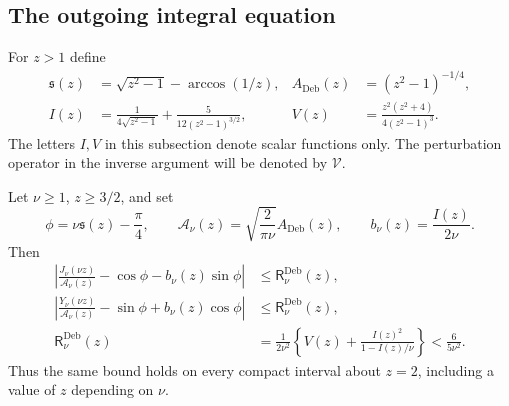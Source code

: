 \subsection{The outgoing integral equation}

For $z>1$ define
\begin{align}
 \mathfrak s(z)&=\sqrt{z^2-1}-\arccos(1/z),
 &A_{\mathrm{Deb}}(z)&=(z^2-1)^{-1/4},\label{inf:debye-definitions}\\
 I(z)&=\frac1{4\sqrt{z^2-1}}+
                \frac5{12(z^2-1)^{3/2}},
 &V(z)&=\frac{z^2(z^2+4)}{4(z^2-1)^3}.\nonumber
\end{align}
The letters $I,V$ in this subsection denote scalar functions only.
The perturbation operator in the inverse argument will be denoted by
$\mathcal V$.

\begin{lemma}\label{inf:debye-first}
Let $\nu\ge1$, $z\ge3/2$, and set
\[
 \phi=\nu\mathfrak s(z)-\frac\pi4,\qquad
 \mathcal A_\nu(z)=\sqrt{\frac2{\pi\nu}}A_{\mathrm{Deb}}(z),
 \qquad b_\nu(z)=\frac{I(z)}{2\nu}.
\]
Then
\begin{align}
 \left|\frac{J_\nu(\nu z)}{\mathcal A_\nu(z)}
           -\cos\phi-b_\nu(z)\sin\phi\right|&\le\mathsf R_\nu^{\mathrm{Deb}}(z),
 \label{inf:debye-J}\\
 \left|\frac{Y_\nu(\nu z)}{\mathcal A_\nu(z)}
           -\sin\phi+b_\nu(z)\cos\phi\right|&\le\mathsf R_\nu^{\mathrm{Deb}}(z),
 \label{inf:debye-Y}\\
 \mathsf R_\nu^{\mathrm{Deb}}(z)&=
 \frac1{2\nu^2}\left\{V(z)+\frac{I(z)^2}{1-I(z)/\nu}\right\}
 <\frac6{5\nu^2}.\label{inf:debye-remainder}
\end{align}
Thus the same bound holds on every compact interval about $z=2$,
including a value of $z$ depending on $\nu$.
\end{lemma}
